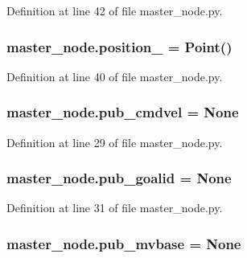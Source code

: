 Definition at line 42 of file master\+\_\+node.\+py.

\subsubsection[{\texorpdfstring{position\+\_\+}{position_}}]{\setlength{\rightskip}{0pt plus 5cm}master\+\_\+node.\+position\+\_\+ = Point()}\hypertarget{namespacemaster__node_a2b8dbb239eb4afff7f8a9c3b753453b7}{}\label{namespacemaster__node_a2b8dbb239eb4afff7f8a9c3b753453b7}


Definition at line 40 of file master\+\_\+node.\+py.

\subsubsection[{\texorpdfstring{pub\+\_\+cmdvel}{pub_cmdvel}}]{\setlength{\rightskip}{0pt plus 5cm}master\+\_\+node.\+pub\+\_\+cmdvel = None}\hypertarget{namespacemaster__node_af03f741dfc4d9a61fc42d34ab839fe6e}{}\label{namespacemaster__node_af03f741dfc4d9a61fc42d34ab839fe6e}


Definition at line 29 of file master\+\_\+node.\+py.

\subsubsection[{\texorpdfstring{pub\+\_\+goalid}{pub_goalid}}]{\setlength{\rightskip}{0pt plus 5cm}master\+\_\+node.\+pub\+\_\+goalid = None}\hypertarget{namespacemaster__node_ad7127d88e820a8bf947a841356004bf6}{}\label{namespacemaster__node_ad7127d88e820a8bf947a841356004bf6}


Definition at line 31 of file master\+\_\+node.\+py.

\subsubsection[{\texorpdfstring{pub\+\_\+mvbase}{pub_mvbase}}]{\setlength{\rightskip}{0pt plus 5cm}master\+\_\+node.\+pub\+\_\+mvbase = None}\hypertarget{namespacemaster__node_a9a27ed10dbb3608f8a22d7d2d8aa1efa}{}\label{namespacemaster__node_a9a27ed10dbb3608f8a22d7d2d8aa1efa}


